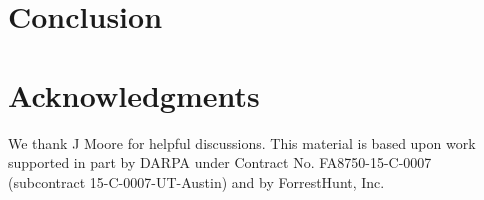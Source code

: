 \documentclass[submission,copyright,creativecommons]{eptcs}
\begin{document}
\section{Conclusion}
\label{sec:conclusion}


\section*{Acknowledgments}

We thank J Moore for helpful discussions.
This material is based upon work supported in part by DARPA under
Contract No. FA8750-15-C-0007 (subcontract 15-C-0007-UT-Austin)
and by ForrestHunt, Inc.



\end{document}
